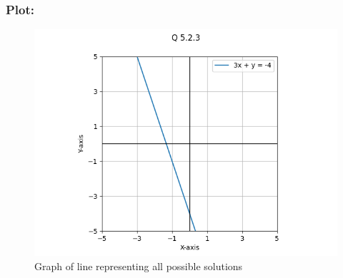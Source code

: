 \documentclass{beamer}
\begin{document}
\begin{frame}
    \frametitle{Plot: }
    \begin{figure}[h!]
        \centering
        \includegraphics[width=0.9\columnwidth]{../figs/plot.png}
        \caption{Graph of line representing all possible solutions}
        \label{fig:5.2.3}
    \end{figure}
\end{frame}
\end{document}
